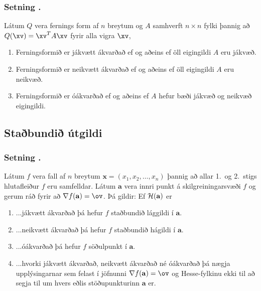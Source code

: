 \subsubsection{Setning \kaflanr.}
 Látum $Q$ vera fernings form  af $n$ breytum og
$A$ samhverft $n\times n$ fylki þannig að $Q(\xv)=\xv^TA\xv$ fyrir
alla vigra $\xv$,
\begin {enumerate}
 \item  Ferningsformið er jákvætt ákvarðað ef og aðeins ef öll eigingildi
    $A$ eru jákvæð.
\item Ferningsformið er neikvætt ákvarðað ef og aðeins ef öll eigingildi
    $A$ eru neikvæð.
\item  Ferningsformið er óákvarðað ef og aðeins ef $A$ hefur bæði jákvæð
     og neikvæð eigingildi.	
\end {enumerate}






\subsection{Staðbundið útgildi} 

\subsubsection{Setning \kaflanr.}
 Látum $f$ vera fall af $n$ breytum $\mathbf{x} = (x_1,x_2,\ldots,x_n)$ þannig að allar
1.~og 2.~stigs hlutafleiður $f$ eru samfelldar.  Látum $\mathbf{a}$ vera
innri punkt á skilgreiningarsvæði $f$ og gerum ráð fyrir að $\nabla
f(\mathbf{a})=\ov$.  Þá gildir: Ef ${\cal H}(\mathbf{a})$ er 
\begin {enumerate}
 \item  ...jákvætt ákvarðað þá hefur $f$ staðbundið
     lággildi í $\mathbf{a}$.
\item ...neikvætt ákvarðað þá hefur $f$ staðbundið
     hágildi í $\mathbf{a}$.
\item    ...óákvarðað þá hefur $f$ söðulpunkt í
      $\mathbf{a}$.  
\item ...hvorki jákvætt ákvarðað, neikvætt ákvarðað
      né óákvarðað þá nægja upplýsingarnar sem felast í jöfnunni
      $\nabla f(\mathbf{a})=\ov$ og Hesse-fylkinu ekki til að segja til um
      hvers eðlis stöðupunkturinn $\mathbf{a}$ er.
\end {enumerate}




